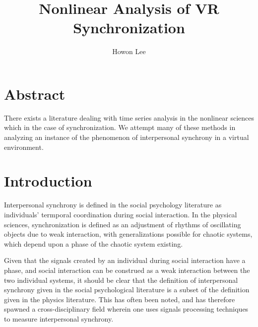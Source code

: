 \documentclass[12pt]{article}
\begin{document}
\title{Nonlinear Analysis of VR Synchronization}
\author{Howon Lee}
\maketitle

\section{Abstract}
There exists a literature dealing with time series analysis in the nonlinear sciences which in the case of synchronization. We attempt many of these methods in analyzing an instance of the phenomenon of interpersonal synchrony in a virtual environment.%


\section{Introduction}









Interpersonal synchrony is defined in the social psychology literature as individuals' termporal coordination during social interaction. In the physical sciences, synchronization is defined as an adjustment of rhythms of oscillating objects due to weak interaction, with generalizations possible for chaotic systems, which depend upon a phase of the chaotic system existing. %

Given that the signals created by an individual during social interaction have a phase, and social interaction can be construed as a weak interaction between the two individual systems, it should be clear that the definition of interpersonal synchrony given in the social psychological literature is a subset of the definition given in the physics literature. This has often been noted, and has therefore spawned a cross-disciplinary field wherein one uses signals processing techniques to measure interpersonal synchrony. %
\end{document}
